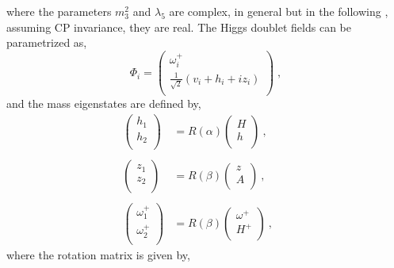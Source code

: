 \newline
where the parameters $m_3^2$ and $\lambda_5$ are complex, in general but in the following , assuming CP invariance, they are real.
The Higgs doublet fields can be parametrized as,
\newline
\begin{equation}
\Phi_i=
\left(
\begin{array}{c}
\omega_i^+   \\
\frac{1}{\sqrt{2}}(v_i +h_i+ iz_i) \\
\end{array}
\right)
\;, \end{equation}
and the mass eigenstates are defined by,
\newline
\begin{equation}
\begin{split}
\left(
\begin{array}{c}
h_1   \\
h_2 \\
\end{array} 
\right) &= R(\alpha)
\left(
\begin{array}{c}
H   \\
h \\
\end{array}
\right)\:, \qquad \\
\\
\left(
\begin{array}{c}
z_1   \\
z_2 \\
\end{array} 
\right) &= R(\beta)
\left(
\begin{array}{c}
z   \\
A \\
\end{array}
\right)\:, \qquad \\
\\
 \left(
\begin{array}{c}
\omega_1^+   \\
\omega_2^+ \\
\end{array}
\right) &= R(\beta)
\left(
\begin{array}{c}
\omega^+   \\
H^+ \\
\end{array}
\right)\:,  \end{split}
\end{equation}
\newline
where the rotation matrix is given by,
